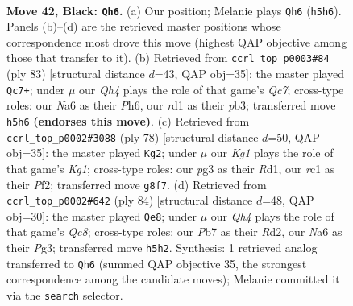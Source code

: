 \documentclass[11pt]{article}
\begin{document}
\clearpage

\begin{figure}[p]\centering
\begin{subfigure}{0.46\textwidth}\centering
\resizebox{\linewidth}{!}{%
\newchessgame
\chessboard[
  setfen={r5k1/pp6/n7/2pPQp1q/8/P5P1/1P3K2/2RR4 b - - 3 42},
  showmover=false,
  pgfstyle=straightmove, color=movearrow, markmove={h5-h6}
]}
\caption{}
\end{subfigure}\hfill
\begin{subfigure}{0.46\textwidth}\centering
\resizebox{\linewidth}{!}{%
\newchessgame
\chessboard[
  setfen={4r1k1/5p2/6pp/3Q4/1p6/1P3R1P/2q2PPK/8 b - - 6 42},
  showmover=false,
  pgfstyle=straightmove, color=movearrow, markmove={c2-c7}
]}
\caption{}
\end{subfigure}
\\[4pt]
\begin{subfigure}{0.46\textwidth}\centering
\resizebox{\linewidth}{!}{%
\newchessgame
\chessboard[
  setfen={5rk1/rq4p1/p2Pp3/4PpP1/Q7/5N2/5P2/3R2K1 w - - 2 40},
  showmover=false,
  pgfstyle=straightmove, color=movearrow, markmove={g1-g2}
]}
\caption{}
\end{subfigure}\hfill
\begin{subfigure}{0.46\textwidth}\centering
\resizebox{\linewidth}{!}{%
\newchessgame
\chessboard[
  setfen={2Q5/p2r1ppk/1p1q3p/3P4/P4P2/6P1/3R2PK/8 w - - 3 43},
  showmover=false,
  pgfstyle=straightmove, color=movearrow, markmove={c8-e8}
]}
\caption{}
\end{subfigure}
\caption{\textbf{Move 42, Black: \texttt{Qh6}.} (a) Our position; Melanie plays \texttt{Qh6} (\texttt{h5h6}). Panels (b)--(d) are the retrieved master positions whose correspondence most drove this move (highest QAP objective among those that transfer to it). (b) Retrieved from \texttt{ccrl\_top\_p0003\#84} (ply 83) [structural distance $d$=43, QAP obj=35]: the master played \texttt{Qc7+}; under $\mu$ our \emph{Qh4} plays the role of that game's \emph{Qc7}; cross-type roles: our \emph{N}a6 as their \emph{P}h6, our \emph{r}d1 as their \emph{p}b3; transferred move \texttt{h5h6} \textbf{(endorses this move)}. (c) Retrieved from \texttt{ccrl\_top\_p0002\#3088} (ply 78) [structural distance $d$=50, QAP obj=35]: the master played \texttt{Kg2}; under $\mu$ our \emph{Kg1} plays the role of that game's \emph{Kg1}; cross-type roles: our \emph{p}g3 as their \emph{R}d1, our \emph{r}c1 as their \emph{P}f2; transferred move \texttt{g8f7}. (d) Retrieved from \texttt{ccrl\_top\_p0002\#642} (ply 84) [structural distance $d$=48, QAP obj=30]: the master played \texttt{Qe8}; under $\mu$ our \emph{Qh4} plays the role of that game's \emph{Qc8}; cross-type roles: our \emph{P}b7 as their \emph{R}d2, our \emph{N}a6 as their \emph{P}g3; transferred move \texttt{h5h2}. Synthesis: 1 retrieved analog transferred to \texttt{Qh6} (summed QAP objective 35, the strongest correspondence among the candidate moves); Melanie committed it via the \texttt{search} selector.}
\label{fig:thought-m83}
\end{figure}
\end{document}
